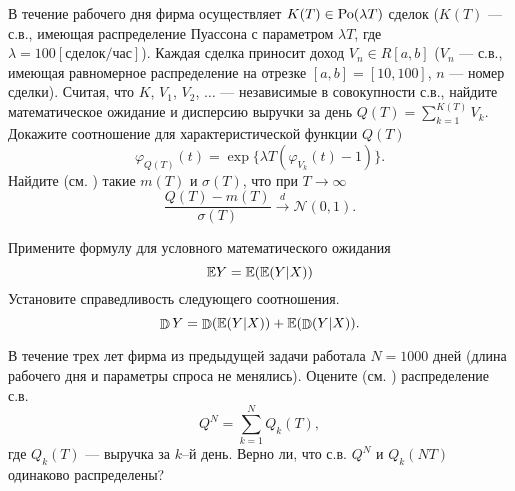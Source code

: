\begin{problem}
\label{sec:cpoisson}
В течение рабочего дня фирма осуществляет $K(T)\in \mathrm{Po}(\lambda T)$ сделок ($K(T)$ --- с.в., имеющая распределение Пуассона с параметром 
$\lambda T$, где $\lambda = 100 [\text{сделок/час}]$). Каждая сделка приносит доход $V_n\in R[a,b]$ ($V_n$ --- с.в., имеющая 
равномерное распределение на отрезке $[a,b]=[10, 100]$, $n$ --- номер сделки). Считая, что $K$, $V_1$, $V_2$, $\ldots$ --- 
независимые в совокупности с.в., найдите математическое ожидание и дисперсию выручки за день $Q(T)=\sum\limits_{k=1}^{K(T)} V_k$. Докажите соотношение для характеристической функции $Q(T)$
$$
\varphi_{Q(T)}(t)=\exp\{ \lambda T(\varphi_{V_k}(t)-1)\}. 
$$
Найдите (см. \cite{5}) такие $m(T)$ и $\sigma(T)$, что при $T\to\infty$
$$\frac{Q(T)-m(T)}{\sigma(T)}\xrightarrow{d} \mathcal{N}(0,1).$$
\end{problem}

\begin{ordre}

Примените формулу для условного математического ожидания  
$$
{\mathbb E}Y= \mathrm{{\mathbb E}}{( {\mathbb E}(Y|X) )} 
$$
Установите справедливость следующего соотношения.
$$
\mathop{\mathbb{D}}\nolimits Y=\mathop{\mathbb{D}}\nolimits({\mathbb E}(Y|X))+{\mathbb E}(\mathop{\mathbb{D}}\nolimits(Y|X)) . 
$$

\end{ordre}


\begin{problem}
В течение трех лет фирма из предыдущей задачи работала $N=1000$ дней (длина рабочего дня и параметры спроса не менялись). 
Оцените (см. \cite{5}) распределение с.в. 
$$Q^N=\sum\limits_{k=1}^{N} Q_k(T), 
$$
где $Q_k(T)$ --- выручка за $k$–й день. Верно ли, что с.в. $Q^N$ и $Q_k(NT)$ одинаково распределены? 
\end{problem}

\begin{comment}
\begin{problem}
В течение года фирма осуществляет $K\in \Po(\lambda)$ сделок ($K$~--- с.в., имеющая распределение Пуассона с параметром  $\lambda=100000$ 
[сделок]). Каждая сделка приносит фирме прибыль $V_n\in R[a,b]$ ($V_n$ -- с.в., имеющая равномерное распределение на отрезке 
$[a,b]=[-50\$,100\$]$, $n$ -- номер сделки). Считая, что $K$, $V_1$, $V_2$, $\ldots$ --- независимые в совокупности с.в., оцените 
\begin{equation}
\label{ProbRatio}
\left. {\mathbb P}\Bigl(\sum\limits_{n=1}^{K} V_n\leqslant 0\Bigr)\right/{\mathbb P}\Bigl(\sum\limits_{n=1}^{K} V_n>0\Bigr). 
\end{equation}
\end{problem}
\end{comment}

